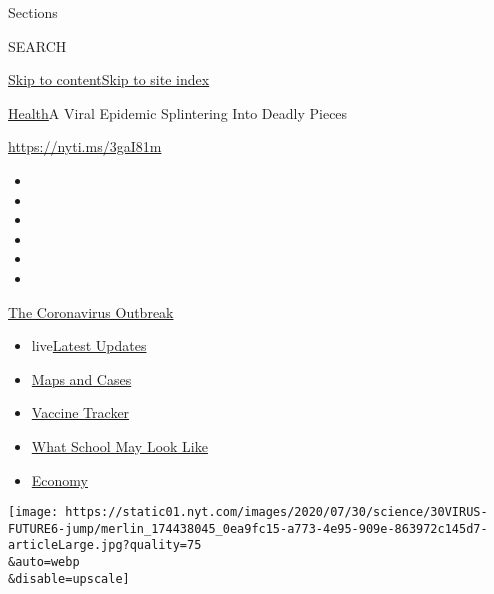 Sections

SEARCH

\protect\hyperlink{site-content}{Skip to
content}\protect\hyperlink{site-index}{Skip to site index}

\href{/section/health}{Health}\textbar{}A Viral Epidemic Splintering
Into Deadly Pieces

\url{https://nyti.ms/3gaI81m}

\begin{itemize}
\item
\item
\item
\item
\item
\item
\end{itemize}

\href{https://www.nytimes.com/news-event/coronavirus?action=click\&pgtype=Article\&state=default\&region=TOP_BANNER\&context=storylines_menu}{The
Coronavirus Outbreak}

\begin{itemize}
\tightlist
\item
  live\href{https://www.nytimes.com/2020/08/01/world/coronavirus-covid-19.html?action=click\&pgtype=Article\&state=default\&region=TOP_BANNER\&context=storylines_menu}{Latest
  Updates}
\item
  \href{https://www.nytimes.com/interactive/2020/us/coronavirus-us-cases.html?action=click\&pgtype=Article\&state=default\&region=TOP_BANNER\&context=storylines_menu}{Maps
  and Cases}
\item
  \href{https://www.nytimes.com/interactive/2020/science/coronavirus-vaccine-tracker.html?action=click\&pgtype=Article\&state=default\&region=TOP_BANNER\&context=storylines_menu}{Vaccine
  Tracker}
\item
  \href{https://www.nytimes.com/interactive/2020/07/29/us/schools-reopening-coronavirus.html?action=click\&pgtype=Article\&state=default\&region=TOP_BANNER\&context=storylines_menu}{What
  School May Look Like}
\item
  \href{https://www.nytimes.com/live/2020/07/31/business/stock-market-today-coronavirus?action=click\&pgtype=Article\&state=default\&region=TOP_BANNER\&context=storylines_menu}{Economy}
\end{itemize}

\texttt{[image: https://static01.nyt.com/images/2020/07/30/science/30VIRUS-FUTURE6-jump/merlin\_174438045\_0ea9fc15-a773-4e95-909e-863972c145d7-articleLarge.jpg?quality=75\\\&auto=webp\\\&disable=upscale]}

